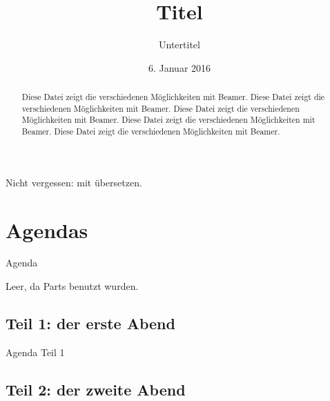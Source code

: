 \usepackage[pangram]{blindtext}

\subject{Thema}
\title{Titel}
\subtitle{Untertitel}
\date{6. Januar 2016}








	\begin{frame}
		Nicht vergessen: mit  übersetzen.
	\end{frame}

	\begin{frame}
		\begin{abstract}
			Diese Datei zeigt die verschiedenen Möglichkeiten mit Beamer.
			Diese Datei zeigt die verschiedenen Möglichkeiten mit Beamer.
			Diese Datei zeigt die verschiedenen Möglichkeiten mit Beamer.
			Diese Datei zeigt die verschiedenen Möglichkeiten mit Beamer.
			Diese Datei zeigt die verschiedenen Möglichkeiten mit Beamer.
		\end{abstract}
	\end{frame}

	\section*{Agendas}

	\begin{frame}{Agenda}
		\tableofcontents

		Leer, da Parts benutzt wurden.
	\end{frame}

	\subsection*{Teil 1: der erste Abend}

	\begin{frame}{Agenda Teil 1}
		\tableofcontents[part=1, subsectionstyle=hide]
	\end{frame}

	\subsection*{Teil 2: der zweite Abend}

